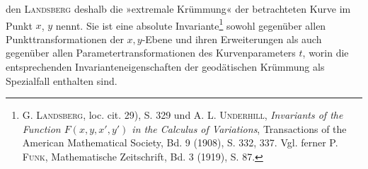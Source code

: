 den \textsc{Landsberg} deshalb die »extremale Krümmung« der betrachteten Kurve
im Punkt $x$, $y$ nennt. Sie ist eine absolute Invariante\footnote{G. \textsc{Landsberg}, loc. cit. 29), S. 329 und A. L. \textsc{Underhill}, \textit{Invariants of the Function $F(x,y,x',y')$
in the Calculus of Variations}, Transactions of the American Mathematical Society, Bd. 9 (1908), S. 332, 337.
Vgl. ferner P. \textsc{Funk}, Mathematische Zeitschrift, Bd. 3 (1919), S. 87.} sowohl gegenüber
allen Punkttransformationen der $x,y$-Ebene und ihren Erweiterungen als auch
gegenüber allen Parametertransformationen des Kurvenparameters $t$, worin die
\clearpage{}
\noindent entsprechenden Invarianteneigenschaften der geodätischen Krümmung als Spezialfall enthalten sind.
\clearpage\endgroup
